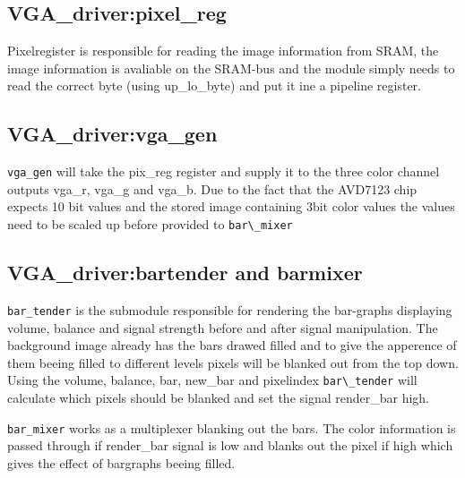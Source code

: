 \subsection{VGA\_driver:pixel\_reg}
Pixelregister is responsible for reading the image information from SRAM, the image information is avaliable
on the SRAM-bus and the module simply needs to read the correct byte (using up\_lo\_byte) and put it ine a pipeline
register.

\subsection{VGA\_driver:vga\_gen}
\verb+vga_gen+ will take the pix\_reg register and supply it to the three color channel outputs 
vga\_r, vga\_g and vga\_b. Due to the fact that the AVD7123 chip expects 10 bit values and the stored image
containing 3bit color values the values need to be scaled up before provided to \verb+bar\_mixer+ 

\subsection{VGA\_driver:bartender and barmixer}\label{bartender}
\verb+bar_tender+ is the submodule responsible for rendering the bar-graphs displaying volume, balance and
signal strength before and after signal manipulation. The background image already has the bars drawed filled
and to give the apperence of them beeing filled to different levels pixels will be blanked out from the top down. Using the volume, balance, bar, new\_bar and pixelindex \verb+bar\_tender+ will calculate which pixels should
be blanked and set the signal render\_bar high.

\verb+bar_mixer+ works as a multiplexer blanking out the bars. The color information is passed through if render\_bar signal is low and blanks out the pixel if high which gives the effect of bargraphs beeing filled.
